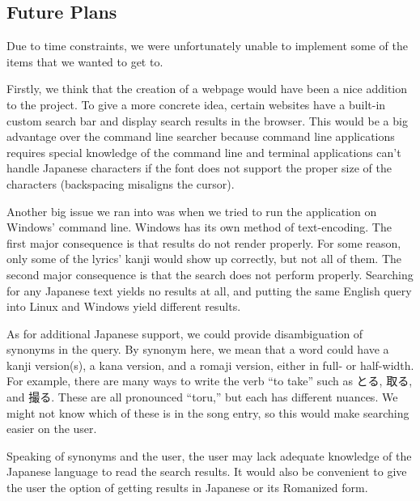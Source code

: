 \documentclass{acm} %
\begin{document}
\begin{CJK}{UTF8}{zhsong}

\section{Future Plans}

Due to time constraints, we were unfortunately unable to implement some of the items that we wanted to get to.

Firstly, we think that the creation of a webpage would have been a nice addition to the project. To give a more concrete idea, certain websites have a built-in custom search bar and display search results in the browser. This would be a big advantage over the command line searcher because command line applications requires special knowledge of the command line and terminal applications can't handle Japanese characters if the font does not support the proper size of the characters (backspacing misaligns the cursor).

Another big issue we ran into was when we tried to run the application on Windows' command line. Windows has its own method of text-encoding. The first major consequence is that results do not render properly. For some reason, only some of the lyrics' kanji would show up correctly, but not all of them. The second major consequence is that the search does not perform properly. Searching for any Japanese text yields no results at all, and putting the same English query into Linux and Windows yield different results.

As for additional Japanese support, we could provide disambiguation of synonyms in the query. By synonym here, we mean that a word could have a kanji version(s), a kana version, and a romaji version, either in full- or half-width. For example, there are many ways to write the verb ``to take'' such as とる, 取る, and 撮る. These are all pronounced ``toru,'' but each has different nuances. We might not know which of these is in the song entry, so this would make searching easier on the user.

Speaking of synonyms and the user, the user may lack adequate knowledge of the Japanese language to read the search results. It would also be convenient to give the user the option of getting results in Japanese or its Romanized form.


\end{CJK}
\end{document}
